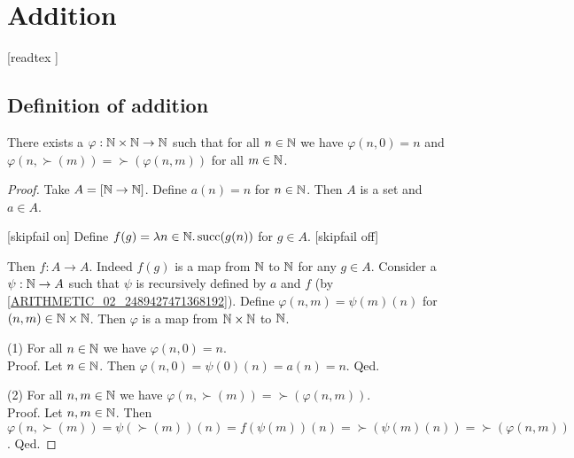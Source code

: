 \documentclass[../arithmetic.tex]{subfiles}
\begin{document}
  \chapter{Addition}\label{chapter:addition}


  \begin{forthel}

    [readtex ]

  \end{forthel}


  \section{Definition of addition}

  \begin{forthel}
    \begin{lemma}
      There exists a $\varphi : \mathbb{N} \times \mathbb{N} \to \mathbb{N}$ such
      that for all $n \in \mathbb{N}$ we have $\varphi(n,0) = n$ and
      $\varphi(n,\succ(m)) = \succ(\varphi(n,m))$ for all $m \in \mathbb{N}$.
    \end{lemma}
    \begin{proof}
      Take $A = [\mathbb{N} \to \mathbb{N}]$.
      Define $a(n) = n$ for $n \in \mathbb{N}$.
      Then $A$ is a set and $a \in A$.

      [skipfail on] %
      Define $f(g) = \mathrm{\lambda} n \in \mathbb{N}. \operatorname{succ}(g(n))$ for $g \in A$.
      [skipfail off]

      Then $f : A \to A$.
      Indeed $f(g)$ is a map from $\mathbb{N}$ to $\mathbb{N}$ for any $g \in A$.
      Consider a $\psi : \mathbb{N} \to A$ such that $\psi$ is recursively defined by
      $a$ and $f$ (by \cref{ARITHMETIC_02_2489427471368192}).
      Define $\varphi(n,m) = \psi(m)(n)$ for $(n,m) \in \mathbb{N} \times \mathbb{N}$.
      Then $\varphi$ is a map from $\mathbb{N} \times \mathbb{N}$ to $\mathbb{N}$.

      (1) For all $n \in \mathbb{N}$ we have $\varphi(n,0) = n$. \\
      Proof.
        Let $n \in \mathbb{N}$.
        Then $\varphi(n,0)
          = \psi(0)(n)
          = a(n)
          = n$.
      Qed.

      (2) For all $n, m \in \mathbb{N}$ we have $\varphi(n, \succ(m)) =
      \succ(\varphi(n,m))$. \\
      Proof.
        Let $n, m \in \mathbb{N}$.
        Then $\varphi(n, \succ(m))
          = \psi(\succ(m))(n)
          = f(\psi(m))(n)
          = \succ(\psi(m)(n))
          = \succ(\varphi(n,m))$.
      Qed.
    \end{proof}
  \end{forthel}
\end{document}
